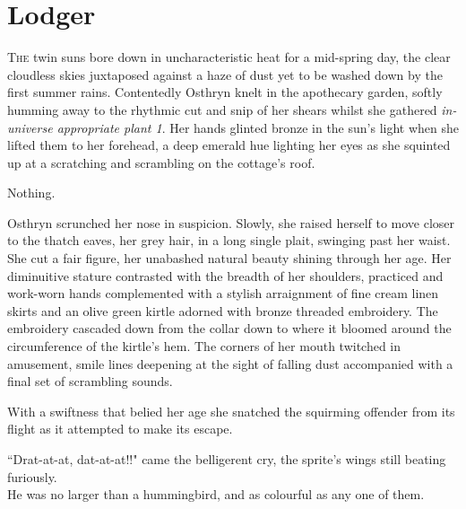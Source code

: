 

\chapter{Lodger}

\lettrine{T}{he} twin suns bore down in uncharacteristic heat for a mid-spring day, the clear cloudless skies juxtaposed against a haze of dust yet to be washed down by the first summer rains.
Contentedly Osthryn knelt in the apothecary garden, softly humming away to the rhythmic cut and snip of her shears whilst she gathered \textit{in-universe appropriate plant 1}.
Her hands glinted bronze in the sun's light when she lifted them to her forehead, a deep emerald hue lighting her eyes as she squinted up at a scratching and scrambling on the cottage's roof.
\vspace{5mm}

Nothing.
\vspace{5mm}

Osthryn scrunched her nose in suspicion. 
Slowly, she raised herself to move closer to the thatch eaves, her grey hair, in a long single plait, swinging past her waist.
She cut a fair figure, her unabashed natural beauty shining through her age.
Her diminuitive stature contrasted with the breadth of her shoulders, practiced and work-worn hands complemented with a stylish arraignment of fine cream linen skirts and an olive green kirtle adorned with bronze threaded embroidery.
The embroidery cascaded down from the collar down to where it bloomed around the circumference of the kirtle's hem. 
The corners of her mouth twitched in amusement, smile lines deepening at the sight of falling dust accompanied with a final set of scrambling sounds.
\vspace{5mm}

With a swiftness that belied her age she snatched the squirming offender from its flight as it attempted to make its escape.
\vspace{5mm}

``Drat-at-at, dat-at-at!!" came the belligerent cry, the sprite's wings still beating furiously.\\
He was no larger than a hummingbird, and as colourful as any one of them. 